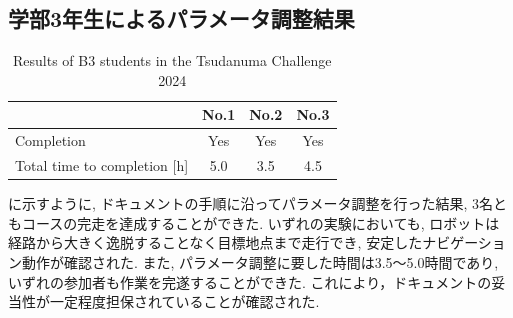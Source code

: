 \subsection{学部3年生によるパラメータ調整結果}
\begin{table}[htbp]
  \centering
  \caption{Results of B3 students in the Tsudanuma Challenge 2024}
  \label{tab:b3_results}
  \begin{tabular}{lccc}
    \hline
     & \textbf{No.1} & \textbf{No.2} & \textbf{No.3} \\
    \hline
    Completion & Yes & Yes & Yes \\
    Total time to completion [h] & 5.0 & 3.5 & 4.5 \\
    \hline
  \end{tabular}
\end{table}
に示すように, ドキュメントの手順に沿ってパラメータ調整を行った結果, 3名ともコースの完走を達成することができた. 
いずれの実験においても, ロボットは経路から大きく逸脱することなく目標地点まで走行でき, 安定したナビゲーション動作が確認された. 
また, パラメータ調整に要した時間は3.5〜5.0時間であり, いずれの参加者も作業を完遂することができた. 
これにより，ドキュメントの妥当性が一定程度担保されていることが確認された. 


